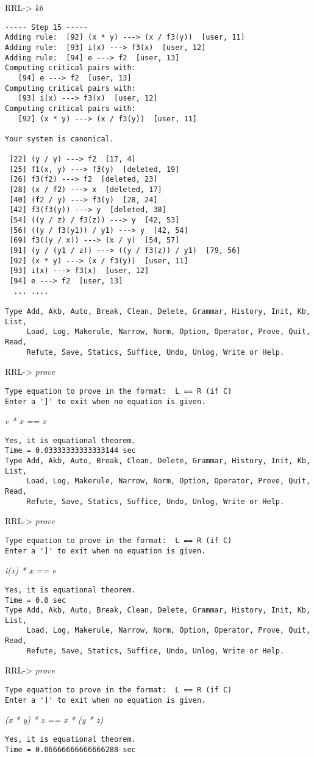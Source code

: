 RRL-> {\em kb}
\begin{verbatim}
----- Step 15 -----
Adding rule:  [92] (x * y) ---> (x / f3(y))  [user, 11]
Adding rule:  [93] i(x) ---> f3(x)  [user, 12]
Adding rule:  [94] e ---> f2  [user, 13]
Computing critical pairs with: 
   [94] e ---> f2  [user, 13]
Computing critical pairs with: 
   [93] i(x) ---> f3(x)  [user, 12]
Computing critical pairs with: 
   [92] (x * y) ---> (x / f3(y))  [user, 11]

Your system is canonical.

 [22] (y / y) ---> f2  [17, 4]
 [25] f1(x, y) ---> f3(y)  [deleted, 19]
 [26] f3(f2) ---> f2  [deleted, 23]
 [28] (x / f2) ---> x  [deleted, 17]
 [40] (f2 / y) ---> f3(y)  [28, 24]
 [42] f3(f3(y)) ---> y  [deleted, 38]
 [54] ((y / z) / f3(z)) ---> y  [42, 53]
 [56] ((y / f3(y1)) / y1) ---> y  [42, 54]
 [69] f3((y / x)) ---> (x / y)  [54, 57]
 [91] (y / (y1 / z)) ---> ((y / f3(z)) / y1)  [79, 56]
 [92] (x * y) ---> (x / f3(y))  [user, 11]
 [93] i(x) ---> f3(x)  [user, 12]
 [94] e ---> f2  [user, 13]
  ... ....

Type Add, Akb, Auto, Break, Clean, Delete, Grammar, History, Init, Kb, List,
     Load, Log, Makerule, Narrow, Norm, Option, Operator, Prove, Quit, Read,
     Refute, Save, Statics, Suffice, Undo, Unlog, Write or Help.
\end{verbatim}
RRL-> {\em prove}
\begin{verbatim}
Type equation to prove in the format:  L == R (if C) 
Enter a ']' to exit when no equation is given.
\end{verbatim}
{\em e * x == x}
\begin{verbatim}
Yes, it is equational theorem.
Time = 0.03333333333333144 sec
Type Add, Akb, Auto, Break, Clean, Delete, Grammar, History, Init, Kb, List,
     Load, Log, Makerule, Narrow, Norm, Option, Operator, Prove, Quit, Read,
     Refute, Save, Statics, Suffice, Undo, Unlog, Write or Help.
\end{verbatim}
RRL-> {\em prove}
\begin{verbatim}
Type equation to prove in the format:  L == R (if C) 
Enter a ']' to exit when no equation is given.
\end{verbatim}
{\em i(x) * x == e}
\begin{verbatim}
Yes, it is equational theorem.
Time = 0.0 sec
Type Add, Akb, Auto, Break, Clean, Delete, Grammar, History, Init, Kb, List,
     Load, Log, Makerule, Narrow, Norm, Option, Operator, Prove, Quit, Read,
     Refute, Save, Statics, Suffice, Undo, Unlog, Write or Help.
\end{verbatim}
RRL-> {\em prove}
\begin{verbatim}
Type equation to prove in the format:  L == R (if C) 
Enter a ']' to exit when no equation is given.
\end{verbatim}
{\em (x * y) * z == x * (y * z)}
\begin{verbatim}
Yes, it is equational theorem.
Time = 0.06666666666666288 sec
\end{verbatim}
\rm
\normalsize
